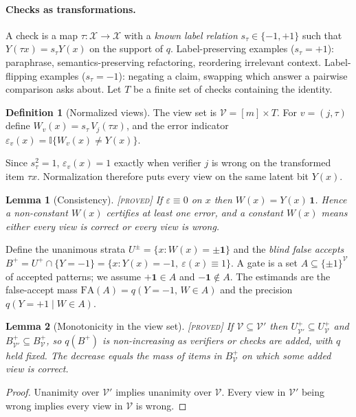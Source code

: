 \documentclass[11pt]{article}
\newtheorem{lemma}{Lemma}
\theoremstyle{definition}
\newtheorem{definition}{Definition}
\theoremstyle{remark}
\newcommand{\status}[1]{\hfill{\normalfont\small\textsc{[#1]}}}
\newcommand{\cV}{\mathcal{V}}
\newcommand{\one}{\mathbf{1}}
\newcommand{\Up}{U^{+}}
\begin{document}
\paragraph{Checks as transformations.} A check is a map $\tau:\mathcal{X}\to\mathcal{X}$ with a \emph{known label relation} $s_\tau\in\{-1,+1\}$ such that $Y(\tau x)=s_\tau Y(x)$ on the support of $q$. Label-preserving examples ($s_\tau=+1$): paraphrase, semantics-preserving refactoring, reordering irrelevant context. Label-flipping examples ($s_\tau=-1$): negating a claim, swapping which answer a pairwise comparison asks about. Let $T$ be a finite set of checks containing the identity.

\begin{definition}[Normalized views]
The view set is $\cV=[m]\times T$. For $v=(j,\tau)$ define $W_v(x)=s_\tau\,V_j(\tau x)$, and the error indicator $\varepsilon_v(x)=\mathbb{I}\{W_v(x)\neq Y(x)\}$.
\end{definition}

Since $s_\tau^2=1$, $\varepsilon_v(x)=1$ exactly when verifier $j$ is wrong on the transformed item $\tau x$. Normalization therefore puts every view on the same latent bit $Y(x)$.

\begin{lemma}[Consistency]\label{lem:consistency}\status{proved}
If $\varepsilon\equiv 0$ on $x$ then $W(x)=Y(x)\,\one$. Hence a non-constant $W(x)$ certifies at least one error, and a constant $W(x)$ means either every view is correct or every view is wrong.
\end{lemma}

Define the unanimous strata $U^{\pm}=\{x:W(x)=\pm\one\}$ and the \emph{blind false accepts} $B^+=\Up\cap\{Y=-1\}=\{x: Y(x)=-1,\ \varepsilon(x)\equiv 1\}$. A gate is a set $A\subseteq\{\pm1\}^{\cV}$ of accepted patterns; we assume $+\one\in A$ and $-\one\notin A$. The estimands are the false-accept mass $\mathrm{FA}(A)=q(Y=-1,\,W\in A)$ and the precision $q(Y=+1\mid W\in A)$.

\begin{lemma}[Monotonicity in the view set]\label{lem:mono}\status{proved}
If $\cV\subseteq\cV'$ then $U^+_{\cV'}\subseteq U^+_{\cV}$ and $B^+_{\cV'}\subseteq B^+_{\cV}$, so $q(B^+)$ is non-increasing as verifiers or checks are added, with $q$ held fixed. The decrease equals the mass of items in $B^+_{\cV}$ on which some added view is correct.
\end{lemma}
\begin{proof}
Unanimity over $\cV'$ implies unanimity over $\cV$. Every view in $\cV'$ being wrong implies every view in $\cV$ is wrong.
\end{proof}
\end{document}
